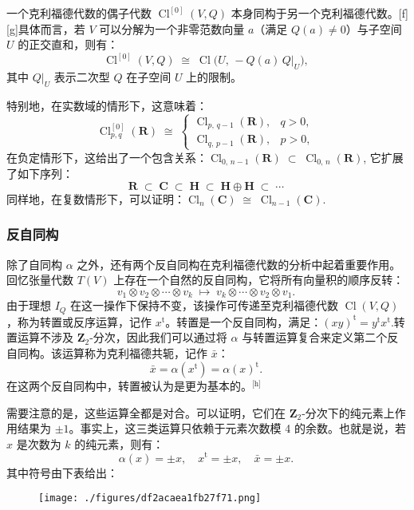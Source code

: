一个克利福德代数的偶子代数 $\operatorname{Cl}^{[0]}(V, Q)$ 本身同构于另一个克利福德代数。[f][g]具体而言，若 $V$ 可以分解为一个非零范数向量 $a$（满足 $Q(a) \neq 0$）与子空间 $U$ 的正交直和，则有：
$$
\operatorname{Cl}^{[0]}(V, Q) \;\cong\; \operatorname{Cl}\bigl(U,\, -Q(a)\, Q|_U \bigr),~
$$
其中 $Q|_U$ 表示二次型 $Q$ 在子空间 $U$ 上的限制。

特别地，在实数域的情形下，这意味着：
$$
\operatorname{Cl}^{[0]}_{p,q}(\mathbf{R}) \;\cong\;
\begin{cases}
\operatorname{Cl}_{p,\,q-1}(\mathbf{R}), & q > 0, \\[6pt]
\operatorname{Cl}_{q,\,p-1}(\mathbf{R}), & p > 0,
\end{cases}~
$$
在负定情形下，这给出了一个包含关系：$\operatorname{Cl}_{0,\,n-1}(\mathbf{R}) \;\subset\; \operatorname{Cl}_{0,\,n}(\mathbf{R})$,
它扩展了如下序列：
$$
\mathbf{R} \;\subset\; \mathbf{C} \;\subset\; \mathbf{H} \;\subset\; \mathbf{H} \oplus \mathbf{H} \;\subset\; \cdots~
$$
同样地，在复数情形下，可以证明：$\operatorname{Cl}_n(\mathbf{C}) \;\cong\; \operatorname{Cl}_{n-1}(\mathbf{C})$.
\subsubsection{反自同构}
除了自同构 $\alpha$ 之外，还有两个反自同构在克利福德代数的分析中起着重要作用。回忆张量代数 $T(V)$ 上存在一个自然的反自同构，它将所有向量积的顺序反转：
$$
v_1 \otimes v_2 \otimes \cdots \otimes v_k 
\;\longmapsto\; 
v_k \otimes \cdots \otimes v_2 \otimes v_1.~
$$
由于理想 $I_Q$ 在这一操作下保持不变，该操作可传递至克利福德代数 $\operatorname{Cl}(V, Q)$，称为转置或反序运算，记作 $x^{\mathrm{t}}$。转置是一个反自同构，满足：$(xy)^{\mathrm{t}} = y^{\mathrm{t}} x^{\mathrm{t}}$.转置运算不涉及 $\mathbf{Z}_2$-分次，因此我们可以通过将 $\alpha$ 与转置运算复合来定义第二个反自同构。该运算称为克利福德共轭，记作 $\bar{x}$：
$$
\bar{x} = \alpha(x^{\mathrm{t}}) = \alpha(x)^{\mathrm{t}}.~
$$
在这两个反自同构中，转置被认为是更为基本的。\(^\text{[h]}\)

需要注意的是，这些运算全都是对合。可以证明，它们在 $\mathbf{Z}_2$-分次下的纯元素上作用结果为 $\pm 1$。事实上，这三类运算只依赖于元素次数模 4 的余数。也就是说，若 $x$ 是次数为 $k$ 的纯元素，则有：
$$
\alpha(x) = \pm x, 
\quad x^{\mathrm{t}} = \pm x, 
\quad \bar{x} = \pm x.~
$$
其中符号由下表给出：
\begin{figure}[ht]
\centering
\texttt{[image: ./figures/df2acaea1fb27f71.png]}
\caption{} \label{fig_KLFds_2}
\end{figure}

